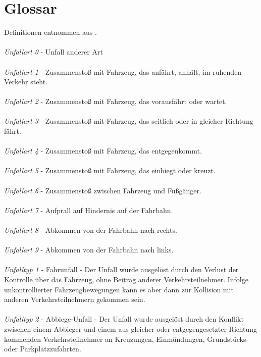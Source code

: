 
 {}
\renewcommand\refname{Glossa} \chapter*{Glossar}
Definitionen entnommen aus \parencite{PolizeiprasidiumOberbeyernSud.2016}.\\
\\
\textit{Unfallart 0} - Unfall anderer Art\\
\\
\textit{Unfallart 1} - Zusammenstoß mit Fahrzeug, das anfährt, anhält, im ruhenden Verkehr steht.\\
\\
\textit{Unfallart 2} - Zusammenstoß mit Fahrzeug, das vorausfährt oder wartet.\\
\\
\textit{Unfallart 3} - Zusammenstoß mit Fahrzeug, das seitlich oder in gleicher Richtung fährt.\\
\\
\textit{Unfallart 4} - Zusammenstoß mit Fahrzeug, das entgegenkommt.\\
\\
\textit{Unfallart 5} - Zusammenstoß mit Fahrzeug, das einbiegt oder kreuzt.\\
\\
\textit{Unfallart 6} - Zusammenstoß zwischen Fahrzeug und Fußgänger.\\
\\
\textit{Unfallart 7} - Aufprall auf Hindernis auf der Fahrbahn.\\
\\
\textit{Unfallart 8} - Abkommen von der Fahrbahn nach rechts.\\
\\
\textit{Unfallart 9} - Abkommen von der Fahrbahn nach links.\\
\\
\textit{Unfalltyp 1} - Fahrunfall - Der Unfall wurde ausgelöst durch den Verlust der Kontrolle über das Fahrzeug, ohne Beitrag anderer Verkehrsteilnehmer. Infolge unkontrollierter Fahrzeugbewegungen kann es aber dann zur Kollision mit anderen Verkehrsteilnehmern gekommen sein.\\
\\
\textit{Unfalltyp 2} - Abbiege-Unfall - Der Unfall wurde ausgelöst durch den Konflikt zwischen einem Abbieger und einem aus gleicher oder entgegengesetzter Richtung kommenden Verkehrsteilnehmer an Kreuzungen, Einmündungen, Grundstücks- oder Parkplatzzufahrten.\\
